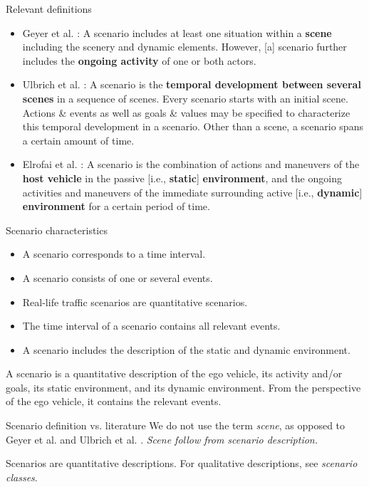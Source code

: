 \documentclass[aspectratio=\AspectR,10pt,compress,t]{beamer} %
\begin{document}
\begin{frame}{Relevant definitions}
	\begin{itemize}
		\item Geyer et al. \cite{geyer2014}: A scenario includes at least one situation within a \textbf{scene} including the scenery and dynamic elements. However, [a] scenario further includes the \textbf{ongoing activity} of one or both actors.
		\item Ulbrich et al. \cite{ulbrich2015}: A scenario is the \textbf{temporal development between several scenes} in a sequence of scenes. Every scenario starts with an initial scene. Actions \& events as well as goals \& values may be specified to characterize this temporal development in a scenario. Other than a scene, a scenario spans a certain amount of time.
		\item Elrofai et al. \cite{elrofai2016scenario}: A scenario is the combination of actions and maneuvers of the \textbf{host vehicle} in the passive [i.e., \textbf{static}] \textbf{environment}, and the ongoing activities and maneuvers of the immediate surrounding active [i.e., \textbf{dynamic}] \textbf{environment} for a certain period of time.
	\end{itemize}
\end{frame}

\begin{frame}{Scenario characteristics}
	\begin{itemize}
		\item A scenario corresponds to a time interval.
		\item A scenario consists of one or several events.
		\item Real-life traffic scenarios are quantitative scenarios.
		\item The time interval of a scenario contains all relevant events.
		\item A scenario includes the description of the static and dynamic environment.
	\end{itemize}
	\begin{definition}[Scenario]
		A scenario is a quantitative description of the ego vehicle, its activity and/or goals, its static environment, and its dynamic environment. From the perspective of the ego vehicle, it contains the relevant events.
	\end{definition}
\end{frame}

\begin{frame}{Scenario definition vs. literature}
	We do not use the term \emph{scene}, as opposed to Geyer et al. \cite{geyer2014} and Ulbrich et al. \cite{ulbrich2015}. \emph{Scene follow from scenario description.}
	
	Scenarios are quantitative descriptions. For qualitative descriptions, see \emph{scenario classes}.
\end{frame}
\end{document}
